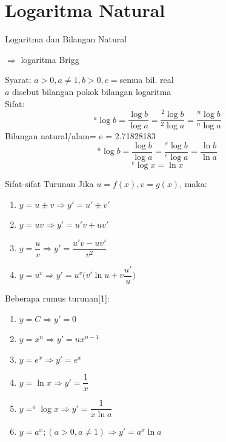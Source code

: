 \documentclass{beamer}
\newcounter{saveenumi}
\newcommand{\seti}{\setcounter{saveenumi}{\value{enumi}}}
\begin{document}
\section{Logaritma Natural}
\begin{frame}[t, fragile]{Logaritma dan Bilangan Natural}
\begin{center}
 $\Longrightarrow$ logaritma Brigg 
\end{center}
Syarat: $a > 0, a \neq 1, b > 0, c = $semua bil. real \\
\hspace{33px} $a$ disebut bilangan pokok bilangan logaritma \\
Sifat:
$$^a\log{b}=\dfrac{\log{b}}{\log{a}}=\dfrac{^2\log{b}}{^2\log{a}}=\dfrac{^n\log{b}}{^n\log{a}}$$
Bilangan natural/alam= e = 2.71828183 \\
$$^a\log{b}=\dfrac{\log{b}}{\log{a}}=\dfrac{^e\log{b}}{^e\log{a}}=\dfrac{\ln{b}}{\ln{a}}$$
$$^e \log {x} = \ln {x}$$
\begin{center}
\end{center}
\end{frame}

\begin{frame}[t, fragile]{Sifat-sifat Turunan}
Jika $u = f(x), v= g(x)$, maka: \\
\begin{enumerate}
\item $y = u \pm v \Longrightarrow y'= u' \pm v'$
\item $y = uv \Longrightarrow y'=u'v + uv'$
\item $y = \dfrac{u}{v} \Longrightarrow y'=\dfrac{u'v-uv'}{v^2}$
\item $y=u^v \Longrightarrow y'=u^v\bigl(v' \ln u+v \dfrac{u'}{u}\bigr)$
\end{enumerate}
Beberapa rumus turunan[1]:
\begin{enumerate}
\item $y=C \Longrightarrow y'=0$
\item $ y = x^n \Longrightarrow y'=nx^{n-1}$
\item $y=e^x \Longrightarrow y'=e^x$
\item $y=\ln x \Longrightarrow y'=\dfrac{1}{x}$
\item $y= ^a\log x \Longrightarrow y'= \dfrac{1}{x \ln a}$
\item $y= a^x; (a>0, a \neq 1) \Longrightarrow y'=a^x \ln a $
\seti
\end{enumerate}
\end{frame}
\end{document}
